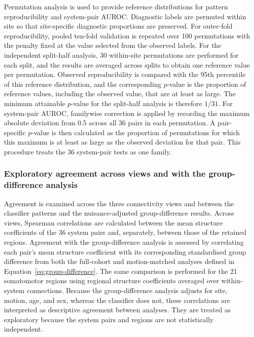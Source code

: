 Permutation analysis is used to provide reference distributions for pattern reproducibility and system-pair AUROC. Diagnostic labels are permuted within site so that site-specific diagnostic proportions are preserved. For outer-fold reproducibility, pooled ten-fold validation is repeated over 100 permutations with the penalty fixed at the value selected from the observed labels. For the independent split-half analysis, 30 within-site permutations are performed for each split, and the results are averaged across splits to obtain one reference value per permutation. Observed reproducibility is compared with the 95th percentile of this reference distribution, and the corresponding $p$-value is the proportion of reference values, including the observed value, that are at least as large. The minimum attainable $p$-value for the split-half analysis is therefore $1/31$. For system-pair AUROC, familywise correction is applied by recording the maximum absolute deviation from 0.5 across all 36 pairs in each permutation. A pair-specific $p$-value is then calculated as the proportion of permutations for which this maximum is at least as large as the observed deviation for that pair. This procedure treats the 36 system-pair tests as one family.

\subsubsection{Exploratory agreement across views and with the group-difference analysis}
\label{subsubsec:interpretation-agreement}

Agreement is examined across the three connectivity views and between the classifier patterns and the nuisance-adjusted group-difference results. Across views, Spearman correlations are calculated between the mean structure coefficients of the 36 system pairs and, separately, between those of the retained regions. Agreement with the group-difference analysis is assessed by correlating each pair's mean structure coefficient with its corresponding standardised group difference from both the full-cohort and motion-matched analyses defined in Equation~\eqref{eq:group-difference}. The same comparison is performed for the 21 somatomotor regions using regional structure coefficients averaged over within-system connections. Because the group-difference analysis adjusts for site, motion, age, and sex, whereas the classifier does not, these correlations are interpreted as descriptive agreement between analyses. They are treated as exploratory because the system pairs and regions are not statistically independent.

